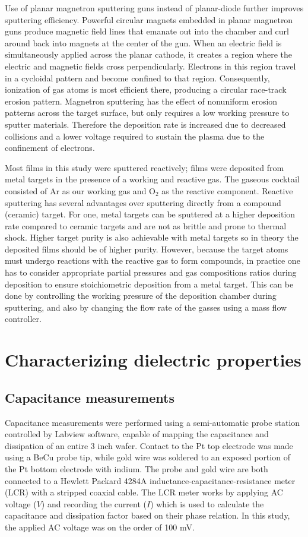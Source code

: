 Use of planar magnetron sputtering guns instead of planar-diode further improves sputtering efficiency. Powerful circular magnets embedded in planar magnetron guns produce magnetic field lines that emanate out into the chamber and curl around back into magnets at the center of the gun. When an electric field is simultaneously applied across the planar cathode, it creates a region where the electric and magnetic fields cross perpendicularly. Electrons in this region travel in a cycloidal pattern and become confined to that region. Consequently, ionization of gas atoms is most efficient there, producing a circular race-track erosion pattern. Magnetron sputtering has the effect of nonuniform erosion patterns across the target surface, but only requires a low working pressure to sputter materials. Therefore the deposition rate is increased due to decreased collisions and a lower voltage required to sustain the plasma due to the confinement of electrons. 

Most films in this study were sputtered reactively; films were deposited from metal targets in the presence of a working and reactive gas. The gaseous cocktail consisted of Ar as our working gas and O$_{2}$ as the reactive component. Reactive sputtering has several advantages over sputtering directly from a compound (ceramic) target. For one, metal targets can be sputtered at a higher deposition rate compared to ceramic targets and are not as brittle and prone to thermal shock. Higher target purity is also achievable with metal targets so in theory the deposited films should be of higher purity. However, because the target atoms must undergo reactions with the reactive gas to form compounds, in practice one has to consider appropriate partial pressures and gas compositions ratios during deposition to ensure stoichiometric deposition from a metal target. This can be done by controlling the working pressure of the deposition chamber during sputtering, and also by changing the flow rate of the gasses using a mass flow controller.


\section{Characterizing dielectric properties}
\subsection{Capacitance measurements}

Capacitance measurements were performed using a semi-automatic probe station controlled by Labview software, capable of mapping the capacitance and dissipation of an entire 3 inch wafer. Contact to the Pt top electrode was made using a BeCu probe tip, while gold wire was soldered to an exposed portion of the Pt bottom electrode with indium. The probe and gold wire are both connected to a Hewlett Packard 4284A inductance-capacitance-resistance meter (LCR) with a stripped coaxial cable. The LCR meter works by applying AC voltage ($V$) and recording the current ($I$) which is used to calculate the capacitance and dissipation factor based on their phase relation. In this study, the applied AC voltage was on the order of 100 mV.


